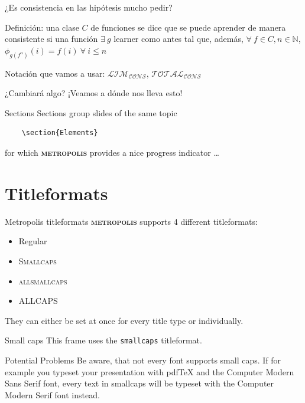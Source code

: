 \documentclass[10pt]{beamer}
\newcommand{\themename}{\textbf{\textsc{metropolis}}\xspace}
\begin{document}
\begin{frame}{¿Es consistencia en las hipótesis mucho pedir?}


Definición: una clase $C$ de funciones se dice que se puede aprender de manera consistente si una función $\exists\ g$ learner como antes tal que, además, $\forall\ f \in C, n \in \mathbb{N}$, $\phi_{g(f^n)}(i) = f(i)\ \forall\ i \leq n$ \newline

Notación que vamos a usar: $\mathcal{LIM_{CONS}}$, $\mathcal{TOTAL_{CONS}}$


¿Cambiará algo? ¡Veamos a dónde nos lleva esto!



\end{frame}


\begin{frame}[fragile]{Sections}
  Sections group slides of the same topic

  \begin{verbatim}    \section{Elements}\end{verbatim}

  for which \themename provides a nice progress indicator \ldots
\end{frame}

\section{Titleformats}

\begin{frame}{Metropolis titleformats}
	\themename supports 4 different titleformats:
	\begin{itemize}
		\item Regular
		\item \textsc{Smallcaps}
		\item \textsc{allsmallcaps}
		\item ALLCAPS
	\end{itemize}
	They can either be set at once for every title type or individually.
\end{frame}

{
\begin{frame}{Small caps}
	This frame uses the \texttt{smallcaps} titleformat.

	\begin{alertblock}{Potential Problems}
		Be aware, that not every font supports small caps. If for example you typeset your presentation with pdfTeX and the Computer Modern Sans Serif font, every text in smallcaps will be typeset with the Computer Modern Serif font instead.
	\end{alertblock}
\end{frame}
}
\end{document}
